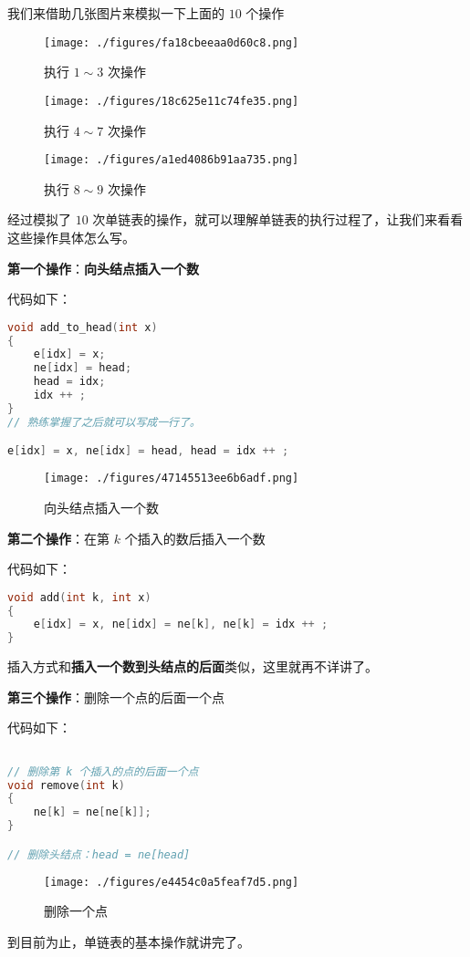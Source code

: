 我们来借助几张图片来模拟一下上面的 $10$ 个操作

\begin{figure}[ht]
\centering
\texttt{[image: ./figures/fa18cbeeaa0d60c8.png]}
\caption{执行 $1\sim3$ 次操作} \label{fig_List_2}
\end{figure}

\begin{figure}[ht]
\centering
\texttt{[image: ./figures/18c625e11c74fe35.png]}
\caption{执行 $4\sim7$ 次操作} \label{fig_List_3}
\end{figure}

\begin{figure}[ht]
\centering
\texttt{[image: ./figures/a1ed4086b91aa735.png]}
\caption{执行 $8\sim9$ 次操作} \label{fig_List_4}
\end{figure}

经过模拟了 $10$ 次单链表的操作，就可以理解单链表的执行过程了，让我们来看看这些操作具体怎么写。

\textbf{第一个操作}：\textbf{向头结点插入一个数}

代码如下：

\begin{lstlisting}[language=cpp]
void add_to_head(int x) 
{
    e[idx] = x;
    ne[idx] = head;
    head = idx;
    idx ++ ;
}
// 熟练掌握了之后就可以写成一行了。

e[idx] = x, ne[idx] = head, head = idx ++ ;
\end{lstlisting}

\begin{figure}[ht]
\centering
\texttt{[image: ./figures/47145513ee6b6adf.png]}
\caption{向头结点插入一个数} \label{fig_List_5}
\end{figure}



\textbf{第二个操作}：在第 $k$ 个插入的数后插入一个数


代码如下：

\begin{lstlisting}[language=cpp]
void add(int k, int x)
{
    e[idx] = x, ne[idx] = ne[k], ne[k] = idx ++ ;
}
\end{lstlisting}

插入方式和\textbf{插入一个数到头结点的后面}类似，这里就再不详讲了。

\textbf{第三个操作}：删除一个点的后面一个点

代码如下：

\begin{lstlisting}[language=cpp]

// 删除第 k 个插入的点的后面一个点
void remove(int k)
{
    ne[k] = ne[ne[k]];
}

// 删除头结点：head = ne[head]
\end{lstlisting}

\begin{figure}[ht]
\centering
\texttt{[image: ./figures/e4454c0a5feaf7d5.png]}
\caption{删除一个点} \label{fig_List_6}
\end{figure}

到目前为止，单链表的基本操作就讲完了。
